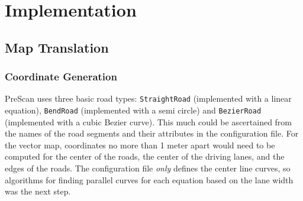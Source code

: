 \documentclass[12pt,twoside]{article}
\begin{document}
\section{Implementation}
\label{section:Implementation}

\subsection{Map Translation}
\subsubsection{Coordinate Generation}
\label{sec:vmap-coords}
PreScan uses three basic road types: \texttt{StraightRoad} (implemented with a linear equation), \texttt{BendRoad} (implemented with a semi circle) and \texttt{BezierRoad} (implemented with a cubic Bezier curve). This much could be ascertained from the names of the road segments and their attributes in the configuration file. For the vector map, coordinates no more than 1 meter apart would need to be computed for the center of the roads, the center of the driving lanes, and the edges of the roads. The configuration file \textit{only} defines the center line curves, so algorithms for finding parallel curves for each equation based on the lane width was the next step.
\end{document}
